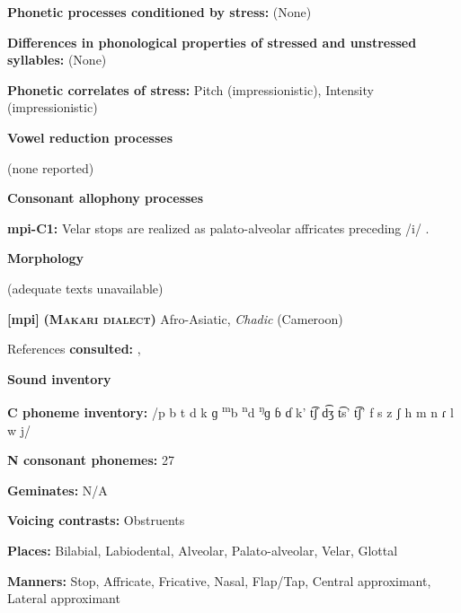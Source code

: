 \textbf{Phonetic processes conditioned by stress:} (None)



\textbf{Differences in phonological properties of stressed and unstressed syllables:} (None)



\textbf{Phonetic correlates of stress:} Pitch (impressionistic), Intensity (impressionistic)



\textbf{Vowel reduction processes}



(none reported)



\textbf{Consonant allophony processes}



\textbf{mpi-C1:} Velar stops are realized as palato-alveolar affricates preceding /i/ \citep{Allison2012}.



\textbf{Morphology}



(adequate texts unavailable)



\textbf{[mpi]}   \textbf{\textsc{ (Makari dialect)}}  Afro-Asiatic, \textit{Chadic} (Cameroon)



References \textbf{consulted:} \citet{Allison2012}, \citet{Mahamat2005}



\textbf{Sound inventory}



\textbf{C phoneme inventory:} /p b t d k ɡ \textsuperscript{m}b \textsuperscript{n}d \textsuperscript{ŋ}ɡ ɓ ɗ k’ t͡ʃ d͡ʒ t͡s’ t͡ʃ’ f s z ʃ h m n ɾ l w j/



\textbf{N consonant phonemes:} 27



\textbf{Geminates:} N/A



\textbf{Voicing contrasts:} Obstruents



\textbf{Places:} Bilabial, Labiodental, Alveolar, Palato-alveolar, Velar, Glottal



\textbf{Manners:} Stop, Affricate, Fricative, Nasal, Flap/Tap, Central approximant, Lateral approximant



